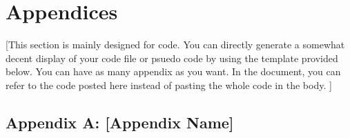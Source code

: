\documentclass[letterpaper, 11pt]{article}
\begin{document}
\clearpage
\section{Appendices} 
[This section is mainly designed for code. You can directly generate a somewhat decent display of your code file or psuedo code by using the template provided below. You can have as many appendix as you want. In the document, you can refer to the code posted here instead of pasting the whole code in the body. ]

\subsection{Appendix A: [Appendix Name]}

\end{document}
